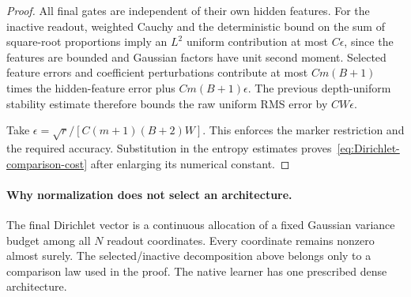 \begin{proof}
All final gates are independent of their own hidden features. For the inactive readout, weighted Cauchy and the deterministic bound on the sum of square-root proportions imply an $L^2$ uniform contribution at most $C\epsilon$, since the features are bounded and Gaussian factors have unit second moment. Selected feature errors and coefficient perturbations contribute at most $Cm(B+1)$ times the hidden-feature error plus $Cm(B+1)\epsilon$. The previous depth-uniform stability estimate therefore bounds the raw uniform RMS error by $CW\epsilon$.

Take $\epsilon=\sqrt r/[C(m+1)(B+2)W]$. This enforces the marker restriction and the required accuracy. Substitution in the entropy estimates proves~\eqref{eq:Dirichlet-comparison-cost} after enlarging its numerical constant.
\end{proof}

\paragraph{Why normalization does not select an architecture.}
The final Dirichlet vector is a continuous allocation of a fixed Gaussian variance budget among all $N$ readout coordinates. Every coordinate remains nonzero almost surely. The selected/inactive decomposition above belongs only to a comparison law used in the proof. The native learner has one prescribed dense architecture.
